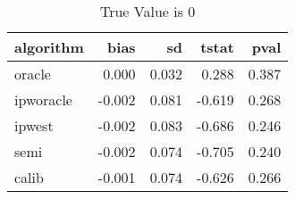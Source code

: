 \begin{table}[h!]

\caption{True Value is 0}
\centering
\begin{tabular}[t]{lrrrr}
\toprule
algorithm & bias & sd & tstat & pval\\
\midrule
oracle & 0.000 & 0.032 & 0.288 & 0.387\\
ipworacle & -0.002 & 0.081 & -0.619 & 0.268\\
ipwest & -0.002 & 0.083 & -0.686 & 0.246\\
semi & -0.002 & 0.074 & -0.705 & 0.240\\
calib & -0.001 & 0.074 & -0.626 & 0.266\\
\bottomrule
\end{tabular}
\end{table}
